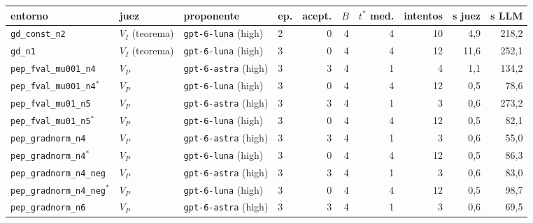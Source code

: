 \documentclass[11pt,a4paper]{article}
\begin{document}
\begin{table}[!ht]
\centering
\scriptsize
\setlength{\tabcolsep}{4pt}
\begin{tabular}{@{}llllrrrrrr@{}}
\toprule
entorno & juez & proponente & ep. & acept. & $B$ & $t^*$ med. & intentos & s juez & s LLM \\
\midrule
\texttt{gd\_\allowbreak{}const\_\allowbreak{}n2} & $V_I$ (teorema) & \texttt{gpt-\allowbreak{}6-\allowbreak{}luna} (high) & 2 & 0 & 4 & 4 & 10 & 4{,}9 & 218{,}2 \\
\texttt{gd\_\allowbreak{}n1} & $V_I$ (teorema) & \texttt{gpt-\allowbreak{}6-\allowbreak{}luna} (high) & 3 & 0 & 4 & 4 & 12 & 11{,}6 & 252{,}1 \\
\texttt{pep\_\allowbreak{}fval\_\allowbreak{}mu001\_\allowbreak{}n4} & $V_P$ & \texttt{gpt-\allowbreak{}6-\allowbreak{}astra} (high) & 3 & 3 & 4 & 1 & 4 & 1{,}1 & 134{,}2 \\
\texttt{pep\_\allowbreak{}fval\_\allowbreak{}mu001\_\allowbreak{}n4}$^\ast$ & $V_P$ & \texttt{gpt-\allowbreak{}6-\allowbreak{}luna} (high) & 3 & 0 & 4 & 4 & 12 & 0{,}5 & 78{,}6 \\
\texttt{pep\_\allowbreak{}fval\_\allowbreak{}mu01\_\allowbreak{}n5} & $V_P$ & \texttt{gpt-\allowbreak{}6-\allowbreak{}astra} (high) & 3 & 3 & 4 & 1 & 3 & 0{,}6 & 273{,}2 \\
\texttt{pep\_\allowbreak{}fval\_\allowbreak{}mu01\_\allowbreak{}n5}$^\ast$ & $V_P$ & \texttt{gpt-\allowbreak{}6-\allowbreak{}luna} (high) & 3 & 0 & 4 & 4 & 12 & 0{,}5 & 82{,}1 \\
\texttt{pep\_\allowbreak{}gradnorm\_\allowbreak{}n4} & $V_P$ & \texttt{gpt-\allowbreak{}6-\allowbreak{}astra} (high) & 3 & 3 & 4 & 1 & 3 & 0{,}6 & 55{,}0 \\
\texttt{pep\_\allowbreak{}gradnorm\_\allowbreak{}n4}$^\ast$ & $V_P$ & \texttt{gpt-\allowbreak{}6-\allowbreak{}luna} (high) & 3 & 0 & 4 & 4 & 12 & 0{,}5 & 86{,}3 \\
\texttt{pep\_\allowbreak{}gradnorm\_\allowbreak{}n4\_\allowbreak{}neg} & $V_P$ & \texttt{gpt-\allowbreak{}6-\allowbreak{}astra} (high) & 3 & 3 & 4 & 1 & 3 & 0{,}6 & 83{,}0 \\
\texttt{pep\_\allowbreak{}gradnorm\_\allowbreak{}n4\_\allowbreak{}neg}$^\ast$ & $V_P$ & \texttt{gpt-\allowbreak{}6-\allowbreak{}luna} (high) & 3 & 0 & 4 & 4 & 12 & 0{,}5 & 98{,}7 \\
\texttt{pep\_\allowbreak{}gradnorm\_\allowbreak{}n6} & $V_P$ & \texttt{gpt-\allowbreak{}6-\allowbreak{}astra} (high) & 3 & 3 & 4 & 1 & 3 & 0{,}6 & 69{,}5 \\

\end{tabular}
\end{table}
\end{document}

